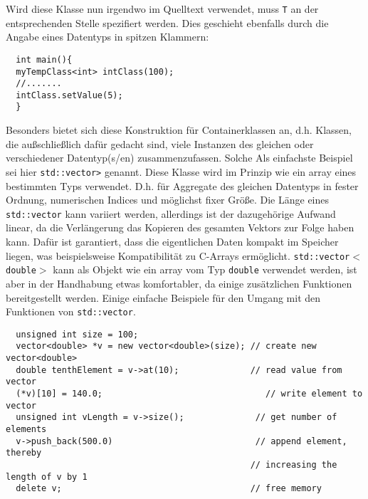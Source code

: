 \documentclass[paper=A4, pagesize, DIV=calc, smallheadings,
fontsize=11pt, expansion=false]{scrreprt}
\begin{document}
  Wird diese Klasse nun irgendwo im Quelltext verwendet, muss \texttt{T} an der entsprechenden Stelle spezifiert werden.
  Dies geschieht ebenfalls durch die Angabe eines Datentyps in spitzen Klammern:

  \begin{verbatim}
  int main(){  
  myTempClass<int> intClass(100);
  //.......
  intClass.setValue(5);
  }
  \end{verbatim}
  
  Besonders bietet sich diese Konstruktion für Containerklassen an, d.h. Klassen, die außschließlich dafür gedacht sind, viele Instanzen des gleichen oder verschiedener Datentyp(s/en) zusammenzufassen.
  Solche 
  Als einfachste Beispiel sei hier \texttt{std::vector>} genannt. Diese Klasse wird im Prinzip wie ein array eines bestimmten Typs verwendet. 
  D.h. für Aggregate des gleichen Datentyps in fester Ordnung, numerischen Indices und möglichst fixer Größe. Die Länge eines \texttt{std::vector} kann variiert werden, allerdings ist der dazugehörige Aufwand linear, da die Verlängerung das Kopieren des gesamten Vektors zur Folge haben kann.
  Dafür ist garantiert, dass die eigentlichen Daten kompakt im Speicher liegen, was beispielsweise Kompatibilität zu C-Arrays ermöglicht.
  \texttt{std::vector$<$double$>$} kann als Objekt wie ein array vom Typ \texttt{double} verwendet werden, ist aber in der Handhabung etwas komfortabler, da einige zusätzlichen Funktionen bereitgestellt werden. Einige einfache Beispiele für den Umgang mit den Funktionen von \texttt{std::vector}.

\begin{verbatim}
  unsigned int size = 100;
  vector<double> *v = new vector<double>(size); // create new vector<double>
  double tenthElement = v->at(10);              // read value from vector
  (*v)[10] = 140.0;                                // write element to vector
  unsigned int vLength = v->size();              // get number of elements
  v->push_back(500.0)                            // append element, thereby 
                                                // increasing the length of v by 1
  delete v;                                     // free memory
\end{verbatim}    
\end{document}
